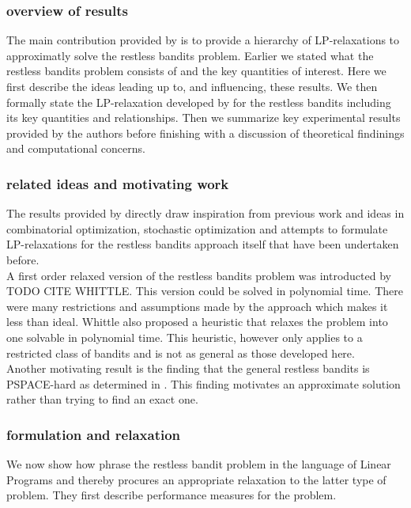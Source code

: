 \subsubsection{overview of results}
The main contribution provided by \citep{bertsimas} is to provide a hierarchy of LP-relaxations
to approximatly solve the restless bandits problem. Earlier we stated what the restless
bandits problem consists of and the key quantities of interest. Here we first describe the ideas leading up to, and influencing, these results. We then formally state the LP-relaxation developed by \citep{bertsimas} for the restless bandits including its key quantities and relationships. Then we summarize key experimental results provided by the authors before finishing with a discussion of theoretical findinings and computational concerns.

\subsubsection{related ideas and motivating work}
The results provided by \citep{bertsimas} directly draw inspiration from previous work and ideas in combinatorial optimization, stochastic optimization and attempts to formulate LP-relaxations for the restless bandits approach itself that have been undertaken before. \\ 


A first order relaxed version of the restless bandits problem was introducted by TODO CITE WHITTLE. This version could be solved in polynomial time. There were many restrictions and assumptions made by the approach which makes it less than ideal. Whittle also proposed a heuristic that relaxes the problem into one solvable in polynomial time. This heuristic, however only applies to a restricted class of bandits and is not as general as those developed here.\\

Another motivating result is the finding that the general restless bandits is PSPACE-hard as determined in \citep{Papad}. This finding motivates an approximate solution rather than trying to find an exact one. \\ 

\subsubsection{formulation and relaxation}

We now show how \citep{bertsimas} phrase the restless bandit problem in the language of Linear Programs and thereby procures an appropriate relaxation to the latter type of problem. They first describe performance measures for the problem.\\

